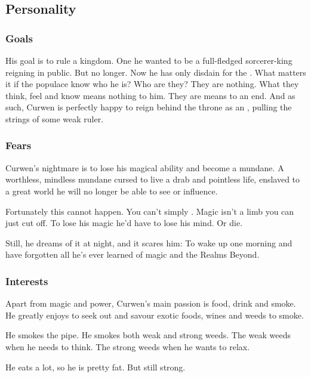 \subsection{Personality}





\subsubsection{Goals}
His goal is to rule a kingdom. 
One he wanted to be a full-fledged sorcerer-king reigning in public. 
But no longer. 
Now he has only disdain for the . 
What matters it if the populace know who he is? 
Who are they?
They are nothing. 
What they think, feel and know means nothing to him. 
They are means to an end. 
And as such, Curwen is perfectly happy to reign behind the throne as an , pulling the strings of some weak ruler. 





\subsubsection{Fears}
Curwen's nightmare is to lose his magical ability and become a mundane. 
A worthless, mindless mundane cursed to live a drab and pointless life, enslaved to a great world he will no longer be able to see or influence. 

Fortunately this cannot happen. 
You can't simply . 
Magic isn't a limb you can just cut off. 
To lose his magic he'd have to lose his mind. 
Or die. 

Still, he dreams of it at night, and it scares him: To wake up one morning and have forgotten all he's ever learned of magic and the Realms Beyond.  





\subsubsection{Interests}
Apart from magic and power, Curwen's main passion is food, drink and smoke. 
He greatly enjoys to seek out and savour exotic foods, wines and weeds to smoke. 

He smokes the pipe. 
He smokes both weak and strong weeds. 
The weak weeds when he needs to think. 
The strong weeds when he wants to relax. 

He eats a lot, so he is pretty fat. 
But still strong. 

